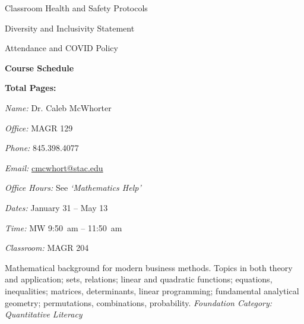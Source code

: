 \documentclass[11pt,letterpaper]{article}
\makeatletter
\newcommand{\classdates}{January 31 -- May 13}
\newcommand{\classtimes}{MW 9:50~am -- 11:50~am}
\newcommand{\classroom}{MAGR 204}
\newcommand{\instructor}{Dr. Caleb McWhorter}
\newcommand{\office}{MAGR 129}
\newcommand{\phone}{845.398.4077}
\newcommand{\email}{cmcwhort@stac.edu}
\newcommand{\officehours}{See \textit{`Mathematics Help'}}
\makeatother
\begin{document}
\begin{minipage}[t]{0.45\textwidth}
\hspace{0.3cm} Classroom Health and Safety Protocols \dotfill \pageref{college_healthsafety} \par
\hspace{0.3cm} Diversity and Inclusivity Statement \dotfill \pageref{college_inclusive} \par
\hspace{0.3cm} Attendance and COVID Policy \dotfill \pageref{college_attnd} \par
{\bfseries\color{stacred} Course Schedule} \dotfill \pageref{schd} \par
\hfill {\bfseries\color{stacred} Total Pages:} \pageref*{LastPage}
\end{minipage}
\sectionbreak









\textit{Name:} \instructor \par
\textit{Office:} \office \par
\textit{Phone:} \phone \par
\textit{Email:} \href{mailto:\email}{\email} \par
\textit{Office Hours:} \officehours 
\sectionbreak



\textit{Dates:} \classdates \par
\textit{Time:} \classtimes \par
\textit{Classroom:} \classroom 
\sectionbreak



Mathematical background for modern business methods. Topics in both theory and application; sets, relations; linear and quadratic functions; equations, inequalities; matrices, determinants, linear programming; fundamental analytical geometry; permutations, combinations, probability. {\itshape Foundation Category: Quantitative Literacy}
\sectionbreak
\end{document}

